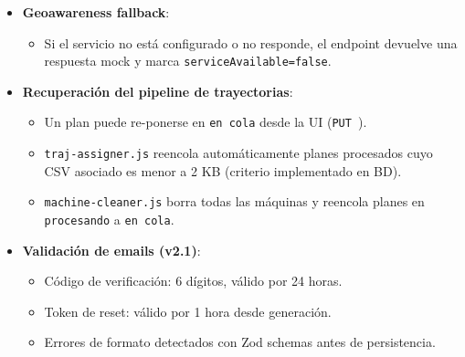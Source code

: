 \documentclass[12pt,a4paper]{article}
\newcommand{\icdendpoint}[1]{\begingroup\small\path{#1}\endgroup}
\begin{document}
\begin{itemize}
\begin{itemize}
    \end{itemize}
    \item \textbf{Geoawareness fallback}:
    \begin{itemize}
        \item Si el servicio no está configurado o no responde, el endpoint devuelve una respuesta mock y marca \texttt{serviceAvailable=false}.
    \end{itemize}
    \item \textbf{Recuperación del pipeline de trayectorias}:
    \begin{itemize}
        \item Un plan puede re-ponerse en \texttt{en cola} desde la UI (\texttt{PUT }\icdendpoint{/api/flightPlans}).
        \item \texttt{traj-assigner.js} reencola automáticamente planes procesados cuyo CSV asociado es menor a 2 KB (criterio implementado en BD).
        \item \texttt{machine-cleaner.js} borra todas las máquinas y reencola planes en \texttt{procesando} a \texttt{en cola}.
    \end{itemize}
    \item \textbf{Validación de emails (v2.1)}:
    \begin{itemize}
        \item Código de verificación: 6 dígitos, válido por 24 horas.
        \item Token de reset: válido por 1 hora desde generación.
        \item Errores de formato detectados con Zod schemas antes de persistencia.
    \end{itemize}
\end{itemize}
\end{document}
